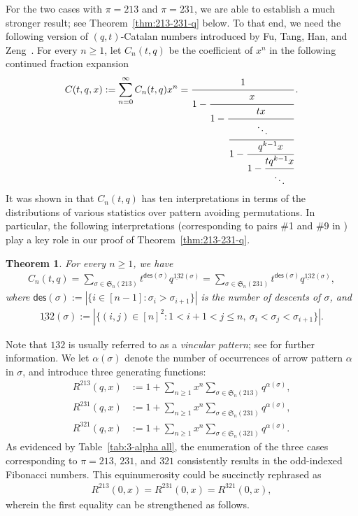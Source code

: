 \documentclass[12pt]{amsart}
\numberwithin{equation}{section}
\theoremstyle{plain}
\newtheorem{theorem}{Theorem}[section]
\def\fS{\mathfrak{S}}
\def\des{\mathsf{des}}
\def\acb{\mathrm{\underline{13}2}}
\begin{document}
For the two cases with $\pi=213$ and $\pi=231$, we are able to establish a much stronger result; see Theorem~\ref{thm:213-231-q} below. To that end, we need the following version of $(q,t)$-Catalan numbers introduced by Fu, Tang, Han, and Zeng~\cite{FTHZ2019}. For every $n\ge 1$, let $C_n(t,q)$ be the coefficient of $x^n$ in the following continued fraction expansion
\begin{align}\label{def-q-nara}
C(t,q,x):=\sum_{n=0}^\infty C_n(t,q) x^n=
\cfrac{1}{
1-\cfrac{x}{1-\cfrac{tx}{
\cfrac{\ddots}{1-\cfrac{q^{k-1}x}{1-\cfrac{tq^{k-1}x}{\ddots}
}}}}}\, .
\end{align}
It was shown in \cite[Theorem~1.1]{FTHZ2019} that $C_n(t,q)$ has ten interpretations in terms of the distributions of various statistics over pattern avoiding permutations. In particular, the following interpretations (corresponding to pairs \#1 and \#9 in \cite[Table~1]{FTHZ2019}) play a key role in our proof of Theorem~\ref{thm:213-231-q}.
\begin{theorem}
For every $n\ge 1$, we have
\begin{align}\label{id:213-231-q}
C_n(t,q) = \sum_{\sigma\in\fS_n(213)}t^{\des(\sigma)}q^{\acb(\sigma)} = \sum_{\sigma\in\fS_n(231)}t^{\des(\sigma)}q^{\acb(\sigma)},
\end{align}
where $\des(\sigma):=|\{i\in[n-1]:\sigma_i>\sigma_{i+1}\}|$ is the number of \emph{descents} of $\sigma$, and
\begin{align*}
	\acb(\sigma) := |\{(i,j)\in[n]^2: 1<i+1<j\le n,~\sigma_i<\sigma_j<\sigma_{i+1}\}|.
\end{align*}
\end{theorem}

Note that $\acb$ is usually referred to as a \emph{vincular pattern}; see \cite[Chapter 7.1]{Kit11} for further information. We let $\alpha(\sigma)$ denote the number of occurrences of arrow pattern $\alpha$ in $\sigma$, and introduce three generating functions:
\begin{align*}
	R^{213}(q,x) &:= 1+\sum_{n\ge 1}x^n\sum_{\sigma\in\fS_n(213)}q^{\alpha(\sigma)},\\
	R^{231}(q,x) &:= 1+\sum_{n\ge 1}x^n\sum_{\sigma\in\fS_n(231)}q^{\alpha(\sigma)},\\
	R^{321}(q,x) &:= 1+\sum_{n\ge 1}x^n\sum_{\sigma\in\fS_n(321)}q^{\alpha(\sigma)}.
\end{align*}
As evidenced by Table~\ref{tab:3-alpha all}, the enumeration of the three cases corresponding to $\pi=213$, $231$, and $321$ consistently results in the odd-indexed Fibonacci numbers. This equinumerosity could be succinctly rephrased as
\begin{align*}
R^{213}(0,x)=R^{231}(0,x)=R^{321}(0,x),
\end{align*}
wherein the first equality can be strengthened as follows.
\end{document}
